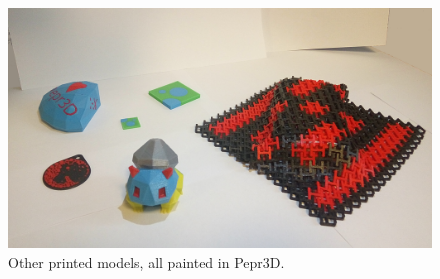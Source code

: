 \vspace{20pt}
\begin{figure}
	\centering
	\centerline{\includegraphics[scale=0.25]{images/results.png}}
	\caption{Other printed models, all painted in Pepr3D.}
	\label{fig:printed2}
\end{figure}

